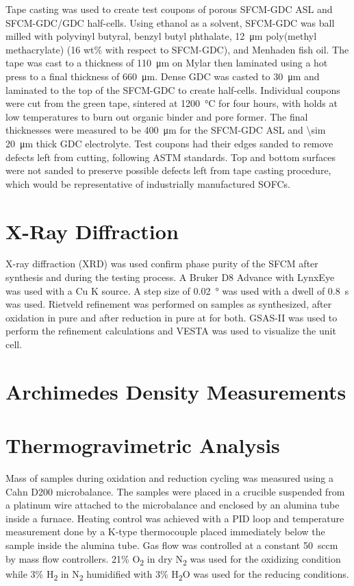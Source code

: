         Tape casting was used to create test coupons of porous SFCM-GDC ASL and SFCM-GDC/GDC half-cells.
        Using ethanol as a solvent, SFCM-GDC was ball milled with polyvinyl butyral, benzyl butyl phthalate, \SI{12}{\micro\meter} poly(methyl methacrylate) (16 wt\% with respect to SFCM-GDC), and Menhaden fish oil.
        The tape was cast to a thickness of \SI{110}{\micro\meter} on Mylar then laminated using a hot press to a final thickness of \SI{660}{\micro\meter}.
        Dense GDC was casted to \SI{30}{\micro\meter} and laminated to the top of the SFCM-GDC to create half-cells.
        Individual coupons were cut from the green tape, sintered at \SI{1200}{\celsius} for four hours, with holds at low temperatures to burn out organic binder and pore former.
        The final thicknesses were measured to be \SI{400}{\micro\meter} for the SFCM-GDC ASL and \SI{\sim 20}{\micro\meter} thick GDC electrolyte.
        Test coupons had their edges sanded to remove defects left from cutting, following ASTM standards.\cite{ASTM2008}
        Top and bottom surfaces were not sanded to preserve possible defects left from tape casting procedure, which would be representative of industrially manufactured SOFCs.

\section{X-Ray Diffraction}
    X-ray diffraction (XRD) was used confirm phase purity of the SFCM after synthesis and during the testing process.
    A Bruker D8 Advance with LynxEye was used with a Cu K\textsubscript{\textalpha{}} source.
    A step size of \SI{0.02}{\degree} was used with a dwell of \SI{0.8}{\second} was used.
    Rietveld refinement was performed on samples as synthesized, after oxidation in pure  and after reduction in pure  at  for both.
    GSAS-II was used to perform the refinement calculations and VESTA was used to visualize the unit cell.\cite{Toby2013,Momma2011}

\section{Archimedes Density Measurements}

\section{Thermogravimetric Analysis}
    Mass of samples during oxidation and reduction cycling was measured using a Cahn D200 microbalance.
    The samples were placed in a crucible suspended from a platinum wire attached to the microbalance and enclosed by an alumina tube inside a furnace.
    Heating control was achieved with a PID loop and temperature measurement done by a K-type thermocouple placed immediately below the sample inside the alumina tube.
    Gas flow was controlled at a constant \SI{50}{sccm} by mass flow controllers.
    21\% O\textsubscript{2} in dry N\textsubscript{2} was used for the oxidizing condition while 3\% H\textsubscript{2} in N\textsubscript{2} humidified with 3\% H\textsubscript{2}O was used for the reducing conditions.


